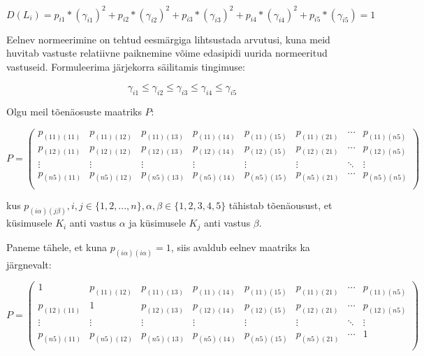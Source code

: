 \documentclass[a4paper]{article}
\newenvironment{tightcenter}{%
  \setlength\topsep{0pt}
  \setlength\parskip{0pt}
  \begin{center}
}{%
  \end{center}
}
\begin{document}
\begin{equation}
D(L_i) = 
p_{i1}*(\gamma_{i1})^2+ p_{i2}*(\gamma_{i2})^2 + p_{i3}*(\gamma_{i3})^2 + p_{i4}*(\gamma_{i4})^2 + p_{i5}*(\gamma_{i5}) = 1 
\end{equation}



Eelnev normeerimine on tehtud eesmärgiga lihtsustada arvutusi, kuna meid huvitab vastuste relatiivne paiknemine võime edasipidi uurida normeeritud vastuseid. Formuleerima järjekorra säilitamis tingimuse:

\begin{equation}
\gamma_{i1} \leq \gamma_{i2}  \leq \gamma_{i3} \leq \gamma_{i4} \leq \gamma_{i5}
\end{equation}

Olgu meil tõenäosuste maatriks $P$:
\begin{tightcenter}
\begin{equation*}
P =
\begin{pmatrix}
p_{(11)(11)}&p_{(11)(12)}&p_{(11)(13)}&p_{(11)(14)}&p_{(11)(15)}&p_{(11)(21)}&\cdots&p_{(11)(n5)} \\
p_{(12)(11)}&p_{(12)(12)}&p_{(12)(13)}&p_{(12)(14)}&p_{(12)(15)}&p_{(12)(21)}&\cdots&p_{(12)(n5)} \\
\vdots&\vdots&\vdots&\vdots&\vdots&\vdots&\ddots&\vdots \\
p_{(n5)(11)}&p_{(n5)(12)}&p_{(n5)(13)}&p_{(n5)(14)}&p_{(n5)(15)}&p_{(n5)(21)}&\cdots&p_{(n5)(n5)} \\
\end{pmatrix} 
\end{equation*}
\end{tightcenter}

kus  $p_{(i \alpha) (j \beta)}, i,j \in \{1,2,...,n\}, \alpha , \beta \in \{1,2,3,4,5\}$ tähistab tõenäousust, et k\"usimusele $K_i$ anti vastus $\alpha$ ja k\"usimusele $K_j$ anti vastus $\beta$. 

Paneme tähele, et kuna $p_{(i \alpha)( i \alpha)} = 1$, siis avaldub eelnev maatriks ka järgnevalt:

\begin{tightcenter}
\begin{equation*}
P =
\begin{pmatrix}
1&p_{(11)(12)}&p_{(11)(13)}&p_{(11)(14)}&p_{(11)(15)}&p_{(11)(21)}&\cdots&p_{(11)(n5)} \\
p_{(12)(11)}&1&p_{(12)(13)}&p_{(12)(14)}&p_{(12)(15)}&p_{(12)(21)}&\cdots&p_{(12)(n5)} \\
\vdots&\vdots&\vdots&\vdots&\vdots&\vdots&\ddots&\vdots \\
p_{(n5)(11)}&p_{(n5)(12)}&p_{(n5)(13)}&p_{(n5)(14)}&p_{(n5)(15)}&p_{(n5)(21)}&\cdots&1\\
\end{pmatrix} 
\end{equation*}
\end{tightcenter}
\end{document}
